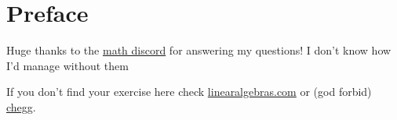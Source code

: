 \documentclass[titlepage,12pt]{book}
\begin{document}
\maketitle
\frontmatter

\chapter*{Preface}
Huge thanks to the \href{https://discord.com/invite/math}{math discord} for answering my questions! I don't know how I'd manage without them \heart
\par

If you don't find your exercise here check \href{https://linearalgebras.com/solution-understanding-analysis.html}{linearalgebras.com} or (god forbid) \href{https://www.chegg.com/homework-help/understanding-analysis-2nd-edition-solutions-9781493927111}{chegg}.
\par

\tableofcontents
\mainmatter







\end{document}
